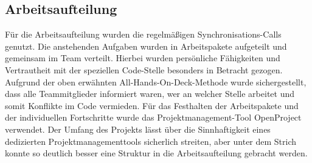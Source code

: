 \subsection{Arbeitsaufteilung}
\label{Arbeitsaufteilung}

Für die Arbeitsaufteilung wurden die regelmäßigen Synchronisations-Calls genutzt. Die anstehenden Aufgaben wurden in Arbeitspakete aufgeteilt und gemeinsam im Team verteilt. Hierbei wurden persönliche Fähigkeiten und Vertrautheit mit der speziellen Code-Stelle besonders in Betracht gezogen. Aufgrund der oben erwähnten All-Hands-On-Deck-Methode wurde sichergestellt, dass alle Teammitglieder informiert waren, wer an welcher Stelle arbeitet und somit Konflikte im Code vermieden.
Für das Festhalten der Arbeitspakete und der individuellen Fortschritte wurde das Projektmanagement-Tool OpenProject verwendet. Der Umfang des Projekts lässt über die Sinnhaftigkeit eines dedizierten Projektmanagementtools sicherlich streiten, aber unter dem Strich konnte so deutlich besser eine Struktur in die Arbeitsaufteilung gebracht werden. \\